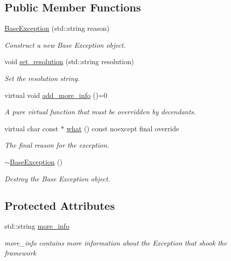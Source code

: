 \subsection*{Public Member Functions}
\begin{DoxyCompactItemize}
\item 
\mbox{\hyperlink{classtestcaser_1_1exceptions_1_1BaseException_a70b5f42e6197e2600f7163f843060af2}{Base\+Exception}} (std\+::string reason)
\begin{DoxyCompactList}\small\item\em Construct a new Base Exception object. \end{DoxyCompactList}\item 
void \mbox{\hyperlink{classtestcaser_1_1exceptions_1_1BaseException_a92c371d40b0f3dbaa7de968ea67e5211}{set\+\_\+resolution}} (std\+::string resolution)
\begin{DoxyCompactList}\small\item\em Set the resolution string. \end{DoxyCompactList}\item 
virtual void \mbox{\hyperlink{classtestcaser_1_1exceptions_1_1BaseException_ad607ea04e2cb4ad9b8d0e2e6b6734f2f}{add\+\_\+more\+\_\+info}} ()=0
\begin{DoxyCompactList}\small\item\em A pure virtual function that must be overridden by decendants. \end{DoxyCompactList}\item 
virtual char const  $\ast$ \mbox{\hyperlink{classtestcaser_1_1exceptions_1_1BaseException_a28590a861913f870d9761990853e74b7}{what}} () const noexcept final override
\begin{DoxyCompactList}\small\item\em The final reason for the exception. \end{DoxyCompactList}\item 
\mbox{\hyperlink{classtestcaser_1_1exceptions_1_1BaseException_adf792df62deef0ec4f4c1e34c59179fa}{$\sim$\+Base\+Exception}} ()
\begin{DoxyCompactList}\small\item\em Destroy the Base Exception object. \end{DoxyCompactList}\end{DoxyCompactItemize}
\subsection*{Protected Attributes}
\begin{DoxyCompactItemize}
\item 
std\+::string \mbox{\hyperlink{classtestcaser_1_1exceptions_1_1BaseException_abfc26d4451ae832886c32ad2e283104e}{more\+\_\+info}}
\begin{DoxyCompactList}\small\item\em more\+\_\+info contains more information about the Exception that shook the framework \end{DoxyCompactList}\end{DoxyCompactItemize}


